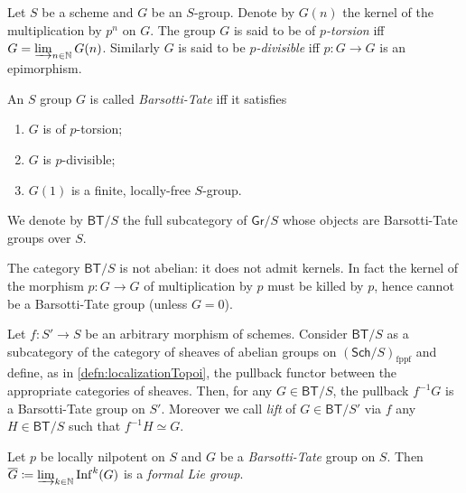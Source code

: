 \begin{defn}
	Let $S$ be a scheme and $G$ be an $S$-group.
	Denote by $G(n)$ the kernel of the multiplication by $p^n$ on $G$.
	The group $G$ is said to be of \emph{$p$-torsion} iff $G = \varinjlim_{n \in \mathbb{N}} G(n)$.
	Similarly $G$ is said to be \emph{$p$-divisible} iff $p\colon G \to G$
	is an epimorphism.
\end{defn}


\begin{defn}\label{BTGroup}
	An $S$ group $G$ is called \emph{Barsotti-Tate} iff it satisfies
\begin{enumerate}
	\item $G$ is of $p$-torsion;
	\item $G$ is $p$-divisible;
	\item $G(1)$ is a finite, locally-free $S$-group.
\end{enumerate}
	We denote by $\mathsf{BT}/S$ the full subcategory of $\mathsf{Gr}/S$
	whose objects are Barsotti-Tate groups over $S$.
\end{defn}


\begin{rem}[]
	The category $\mathsf{BT}/S$ is not abelian:
	it does not admit kernels.
	In fact the kernel of the morphism $p\colon G \to G$
	of multiplication by $p$ must be killed by $p$, hence cannot be
	a Barsotti-Tate group (unless $G=0$).
\end{rem}


\begin{rem}
	Let $f\colon S' \to S$ be an arbitrary morphism of schemes.
	Consider $\mathsf{BT}/S$ as a subcategory of the category of
	sheaves of abelian groups on $\left( \mathsf{Sch}/S  \right)_{\mathrm{fppf}}$
	and define, as in \cref{defn:localizationTopoi}, the pullback
	functor between the appropriate categories of sheaves.
	Then, for any $G \in \mathsf{BT}/S$, the pullback $f^{-1} G$
	is a Barsotti-Tate group on $S'$.
	Moreover we call \emph{lift} of $G \in \mathsf{BT}/S'$ via $f$ any 
	$H \in \mathsf{BT}/S$ such that $f^{-1}H \simeq G$.
\end{rem}


\begin{lem}
	Let $p$ be locally nilpotent on $S$ and $G$ be a \emph{Barsotti-Tate} group on $S$.
	Then
	$\overline{G} \coloneqq \varinjlim_{k \in \mathbb{N}} \operatorname{Inf}^k(G)$
	is a \emph{formal Lie group}.
\end{lem}


